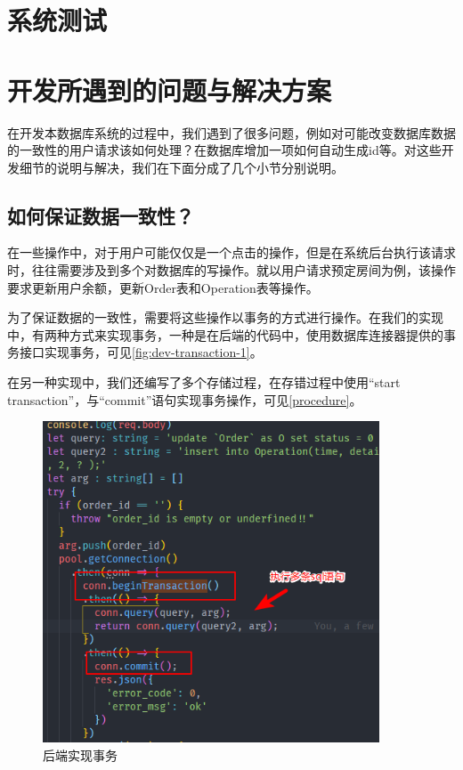 \documentclass{myreport}
\begin{document}

\chapter{系统测试}




\chapter{开发所遇到的问题与解决方案}


在开发本数据库系统的过程中，我们遇到了很多问题，例如对可能改变数据库数据的一致性的用户请求该如何处理？在数据库增加一项如何自动生成id等。对这些开发细节的说明与解决，我们在下面分成了几个小节分别说明。

\section{如何保证数据一致性？}

在一些操作中，对于用户可能仅仅是一个点击的操作，但是在系统后台执行该请求时，往往需要涉及到多个对数据库的写操作。就以用户请求预定房间为例，该操作要求更新用户余额，更新Order表和Operation表等操作。

为了保证数据的一致性，需要将这些操作以事务的方式进行操作。在我们的实现中，有两种方式来实现事务，一种是在后端的代码中，使用数据库连接器提供的事务接口实现事务，可见\autoref{fig:dev-transaction-1}。

在另一种实现中，我们还编写了多个存储过程，在存错过程中使用“start transaction”，与“commit”语句实现事务操作，可见\autoref{procedure}。


\begin{figure}[htp]
    \centering
    \includegraphics[width=10cm]{figure/2018-12-22-12-35-08.png}
    \caption{后端实现事务}
    \label{fig:dev-transaction-1}
\end{figure}
\end{document}
